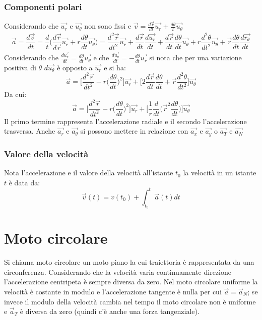 \documentclass[class=book, crop=false, oneside, 12pt]{standalone}
\begin{document}
		\subsubsection{Componenti polari}
    Considerando che $\overrightarrow{u_r}$ e $\overrightarrow{u_\theta}$ non sono fissi e $\overrightarrow{v}=\frac{d\overrightarrow{r}}{dt}\overrightarrow{u_r}+\frac{d\theta}{t}\overrightarrow{u_\theta}$
		\begin{align*}
      \overrightarrow{a}=\dfrac{d\overrightarrow{v}}{dt}=\dfrac{d}{t}\biggl(\dfrac{d\overrightarrow{r}}{d\overrightarrow{r}}\overrightarrow{u_r}+r\dfrac{d\theta}{dt}\overrightarrow{u_\theta}\biggr)=\dfrac{d^2\overrightarrow{r}}{dt^2}\overrightarrow{u_r}+\dfrac{d\overrightarrow{r}}{dt}\dfrac{d\overrightarrow{u_r}}{dt}+\dfrac{d\overrightarrow{r}}{dt}\dfrac{d\theta}{dt}\overrightarrow{u_\theta}+r\dfrac{d^2\theta}{dt^2}\overrightarrow{u_\theta}+\overrightarrow{r}\dfrac{d\theta}{dt}\dfrac{d\overrightarrow{r_\theta}}{dt}
		\end{align*}
    Considerando che $\frac{d\overrightarrow{u_r}}{dt}=\frac{d\theta}{dt}\overrightarrow{u_\theta}$ e che $\frac{d\overrightarrow{u_\theta}}{dt}=-\frac{d\theta}{dt}\overrightarrow{u_r}$ si nota che per una variazione positiva di $\theta$ $d\overrightarrow{u_\theta}$ \`e opposto a $\overrightarrow{u_r}$  e si ha:
    $$\overrightarrow{a}=\biggl[\dfrac{d^2\overrightarrow{r}}{dt^2}-r\biggl(\dfrac{d\theta}{dt}\biggr)^2\biggr]\overrightarrow{u_r}+\biggl[2\dfrac{d\overrightarrow{r}}{dt}\dfrac{d\theta}{dt}+\overrightarrow{r}\dfrac{d^2\theta}{dt^2}\biggr]\overrightarrow{u_\theta}$$
		Da cui:
    $$\overrightarrow{a}=\biggl[\dfrac{d^2\overrightarrow{r}}{dt^2}-r\biggl(\dfrac{d\theta}{dt}\biggr)^2\biggr]\overrightarrow{u_r}+\biggl[\dfrac{1}{r}\dfrac{d}{dt}\biggl(\overrightarrow{r}^2\dfrac{d\theta}{dt}\biggr)\biggr]\overrightarrow{u_\theta}$$
		Il primo termine rappresenta l'accelerazione radiale e il secondo l'accelerazione trasversa.
    Anche $\overrightarrow{a_r}$ e $\overrightarrow{a_\theta}$ si possono mettere in relazione con $\overrightarrow{a_x}$ e $\overrightarrow{a_y}$ o $\overrightarrow{a_T}$ e $\overrightarrow{a_N}$
		\subsubsection{Valore della velocit\`a}
		Nota l'accelerazione e il valore della velocit\`a all'istante $t_0$ la velocit\`a in un istante $t$ \`e data da:
    $$\overrightarrow{v}(t)=v(t_0)+\int_{t_0}^t\overrightarrow{a}(t)dt$$
\section{Moto circolare}
Si chiama moto circolare un moto piano la cui traiettoria è rappresentata da una circonferenza.
Considerando che la velocità varia continuamente direzione l'accelerazione centripeta è sempre diversa da zero.
Nel moto circolare uniforme la velocità è costante in modulo e l'accelerazione tangente è nulla per cui \(\overrightarrow{a} = \overrightarrow{a}_N\);
se invece il modulo della velocità cambia nel tempo il moto circolare non è uniforme e \(\overrightarrow{a}_T\) è diversa da zero (quindi c'è anche una forza tangenziale).
\end{document}
